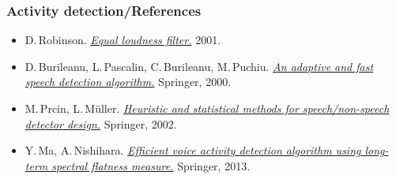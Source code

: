 \begin{frame} %
	\frametitle{Activity detection/References}
	\begin{itemize}
		\item D.\,Robinson. \href{http://replaygain.hydrogenaud.io/proposal/equal_loudness.html}{\emph{Equal loudness filter.}} 2001.
		\item D.\,Burileanu, L.\,Pascalin, C.\,Burileanu, M.\,Puchiu. \href{http://dx.doi.org/10.1007/3-540-45323-7_30}{\emph{An adaptive and fast speech detection algorithm.}} Springer, 2000.
		\item M.\,Prcin, L.\,Müller. \href{http://dx.doi.org/10.1007/3-540-46154-X_42}{\emph{Heuristic and statistical methods for speech/non-speech detector design.}} Springer, 2002.
		\item Y.\,Ma, A.\,Nishihara. \href{http://dx.doi.org/10.1186/1687-4722-2013-21}{\emph{Efficient voice activity detection algorithm using long-term spectral flatness measure.}} Springer, 2013.
	\end{itemize}
\end{frame}

